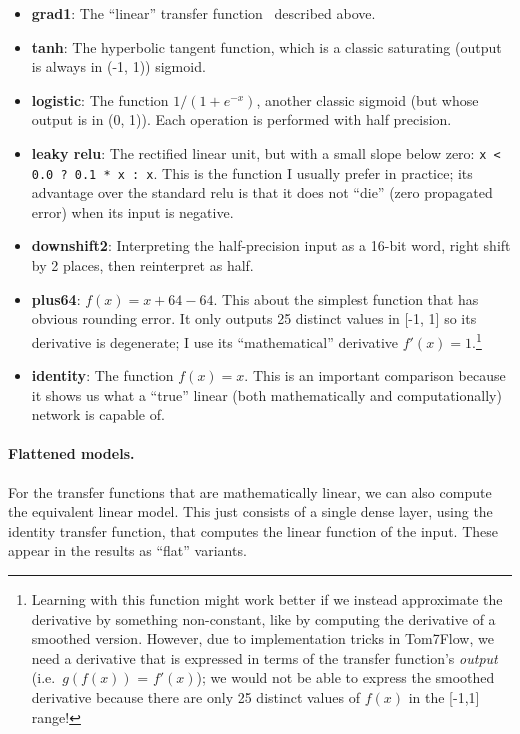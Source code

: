 \documentclass[twocolumn]{article}
\begin{document}
\begin{itemize}
\item {\bf grad1}: The ``linear'' transfer function \gradone\ described above.
\item {\bf tanh}: The hyperbolic tangent function, which is a classic saturating (output is always in (-1, 1)) sigmoid.
\item {\bf logistic}: The function $1 / (1 + e^{-x})$, another classic sigmoid (but whose output is in (0, 1)). Each operation is performed with half precision.
\item {\bf leaky relu}: The rectified linear unit, but with a small slope below zero: \verb|x < 0.0 ? 0.1 * x : x|. This is the function I usually prefer in practice; its advantage over the standard relu is that it does not ``die'' (zero propagated error) when its input is negative.
\item {\bf downshift2}: Interpreting the half-precision input as a 16-bit word, right shift by 2 places, then reinterpret as half.
\item {\bf plus64}: $f(x) = x + 64 - 64$. This about the simplest function that has obvious rounding error. It only outputs 25 distinct values in [-1, 1] so its derivative is degenerate; I use its ``mathematical'' derivative $f'(x) = 1$.\footnote{Learning with this function might work better if we instead approximate the derivative by something non-constant, like by computing the derivative of a smoothed version. However, due to implementation tricks in Tom7Flow, we need a derivative that is expressed in terms of the transfer function's {\it output} (i.e.~$g(f(x))$ = $f'(x)$); we would not be able to express the smoothed derivative because there are only 25 distinct values of $f(x)$ in the [-1,1] range!}
\item {\bf identity}: The function $f(x) = x$. This is an important comparison because it shows us what a ``true'' linear (both mathematically and computationally) network is capable of.
\end{itemize}

\paragraph{Flattened models.}
For the transfer functions that are mathematically linear, we can also
compute the equivalent linear model. This just consists of a single
dense layer, using the identity transfer function, that computes the
linear function of the input. These appear in the results as ``flat''
variants.
\end{document}
